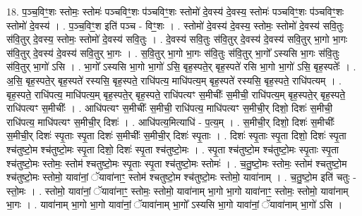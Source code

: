 \documentclass[17pt]{extarticle}
\begin{document}
18. प॒ञ्च॒विꣳ॒॒शः स्तोमः॒ स्तोमः॑ पञ्चविꣳ॒॒शः प॑ञ्चविꣳ॒॒शः स्तोमो॑ दे॒वस्य॑ दे॒वस्य॒ स्तोमः॑ पञ्चविꣳ॒॒शः प॑ञ्चविꣳ॒॒शः स्तोमो॑ दे॒वस्य॑ । . प॒ञ्च॒विꣳ॒॒श इति॑ पञ्च - विꣳ॒॒शः । . स्तोमो॑ दे॒वस्य॑ दे॒वस्य॒ स्तोमः॒ स्तोमो॑ दे॒वस्य॑ सवि॒तुः स॑वि॒तुर् दे॒वस्य॒ स्तोमः॒ स्तोमो॑ दे॒वस्य॑ सवि॒तुः । . दे॒वस्य॑ सवि॒तुः स॑वि॒तुर् दे॒वस्य॑ दे॒वस्य॑ सवि॒तुर् भा॒गो भा॒गः स॑वि॒तुर् दे॒वस्य॑ दे॒वस्य॑ सवि॒तुर् भा॒गः । . स॒वि॒तुर् भा॒गो भा॒गः स॑वि॒तुः स॑वि॒तुर् भा॒गो᳚ ऽस्यसि भा॒गः स॑वि॒तुः स॑वि॒तुर् भा॒गो॑ ऽसि । . भा॒गो᳚ ऽस्यसि भा॒गो भा॒गो॑ ऽसि॒ बृह॒स्पते॒र् बृह॒स्पते॑ रसि भा॒गो भा॒गो॑ ऽसि॒ बृह॒स्पतेः᳚ । . अ॒सि॒ बृह॒स्पते॒र् बृह॒स्पते॑ रस्यसि॒ बृह॒स्पते॒ राधि॑पत्य॒ माधि॑पत्य॒म् बृह॒स्पते॑ रस्यसि॒ बृह॒स्पते॒ राधि॑पत्यम् । . बृह॒स्पते॒ राधि॑पत्य॒ माधि॑पत्य॒म् बृह॒स्पते॒र् बृह॒स्पते॒ राधि॑पत्यꣳ स॒मीचीः᳚ स॒मीची॒ राधि॑पत्य॒म् बृह॒स्पते॒र् बृह॒स्पते॒ राधि॑पत्यꣳ स॒मीचीः᳚ । . आधि॑पत्यꣳ स॒मीचीः᳚ स॒मीची॒ राधि॑पत्य॒ माधि॑पत्यꣳ स॒मीची॒र् दिशो॒ दिशः॑ स॒मीची॒ राधि॑पत्य॒ माधि॑पत्यꣳ स॒मीची॒र् दिशः॑ । . आधि॑पत्य॒मित्याधि॑ - प॒त्य॒म् । . स॒मीची॒र् दिशो॒ दिशः॑ स॒मीचीः᳚ स॒मीची॒र् दिशः॑ स्पृ॒ताः स्पृ॒ता दिशः॑ स॒मीचीः᳚ स॒मीची॒र् दिशः॑ स्पृ॒ताः । . दिशः॑ स्पृ॒ताः स्पृ॒ता दिशो॒ दिशः॑ स्पृ॒ता श्च॑तुष्टो॒म श्च॑तुष्टो॒मः स्पृ॒ता दिशो॒ दिशः॑ स्पृ॒ता श्च॑तुष्टो॒मः । . स्पृ॒ता श्च॑तुष्टो॒म श्च॑तुष्टो॒मः स्पृ॒ताः स्पृ॒ता श्च॑तुष्टो॒मः स्तोमः॒ स्तोम॑ श्चतुष्टो॒मः स्पृ॒ताः स्पृ॒ता श्च॑तुष्टो॒मः स्तोमः॑ । . च॒तु॒ष्टो॒मः स्तोमः॒ स्तोम॑ श्चतुष्टो॒म श्च॑तुष्टो॒मः स्तोमो॒ यावा॑नां॒ ॅयावा॑नाꣳ॒॒ स्तोम॑ श्चतुष्टो॒म श्च॑तुष्टो॒मः स्तोमो॒ यावा॑नाम् । . च॒तु॒ष्टो॒म इति॑ चतुः - स्तो॒मः । . स्तोमो॒ यावा॑नां॒ ॅयावा॑नाꣳ॒॒ स्तोमः॒ स्तोमो॒ यावा॑नाम् भा॒गो भा॒गो यावा॑नाꣳ॒॒ स्तोमः॒ स्तोमो॒ यावा॑नाम् भा॒गः । . यावा॑नाम् भा॒गो भा॒गो यावा॑नां॒ ॅयावा॑नाम् भा॒गो᳚ ऽस्यसि भा॒गो यावा॑नां॒ ॅयावा॑नाम् भा॒गो॑ ऽसि । \newline
\end{document}
